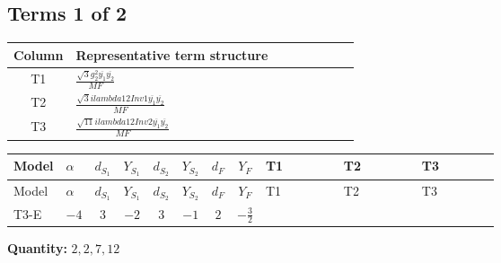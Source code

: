 \documentclass[8pt]{article}
\begin{document}
\begin{landscape}
\subsection*{Terms 1 of 2}
\begin{center}
\begin{tabular}{@{}c >{\raggedright\arraybackslash}p{0.82\linewidth}@{}}
\toprule
Column & Representative term structure \\
\midrule
T1 & \(\displaystyle \frac{\sqrt{3} g_{2}^{2} \overline{y_{1}} \overline{y_{2}}}{MF}\) \\
\midrule
T2 & \(\displaystyle \frac{\sqrt{3} i lambda12Inv1 \overline{y_{1}} \overline{y_{2}}}{MF}\) \\
\midrule
T3 & \(\displaystyle \frac{\sqrt{11} i lambda12Inv2 \overline{y_{1}} \overline{y_{2}}}{MF}\) \\
\midrule
\bottomrule
\end{tabular}
\end{center}
\smallskip
\tiny
\begin{longtable}{@{}llcccccc >{\raggedright\arraybackslash}p{0.21\linewidth} >{\raggedright\arraybackslash}p{0.21\linewidth} >{\raggedright\arraybackslash}p{0.21\linewidth}@{}}
\toprule
Model & $\alpha$ & $d_{S_1}$ & $Y_{S_1}$ & $d_{S_2}$ & $Y_{S_2}$ & $d_F$ & $Y_F$ & T1 & T2 & T3 \\
\midrule
\endfirsthead
\toprule
Model & $\alpha$ & $d_{S_1}$ & $Y_{S_1}$ & $d_{S_2}$ & $Y_{S_2}$ & $d_F$ & $Y_F$ & T1 & T2 & T3 \\
\midrule
\endhead
T3-E & $-4$ & $3$ & $-2$ & $3$ & $-1$ & $2$ & $-\frac{3}{2}$ & \scriptsize\adjustbox{max width=\linewidth}{$\begin{gathered} \frac{\sqrt{3} g_{2}^{2} \overline{y_{1}} \overline{y_{2}}}{6 MF}\end{gathered}$} & \scriptsize\adjustbox{max width=\linewidth}{$\begin{gathered} - \frac{\sqrt{3} i lambda12Inv1 \overline{y_{1}} \overline{y_{2}}}{6 MF}\end{gathered}$} & \scriptsize\adjustbox{max width=\linewidth}{$\begin{gathered} \frac{3 \sqrt{11} i lambda12Inv2 \overline{y_{1}} \overline{y_{2}}}{22 MF}\end{gathered}$} \\
\midrule
\bottomrule
\end{longtable}
\clearpage
\noindent\textbf{Quantity: }$\mathrm{2,2,7,12}$\par\smallskip

\end{landscape}
\end{document}
